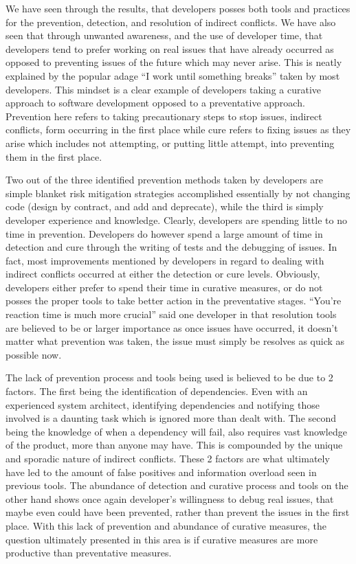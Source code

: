 We have seen through the results, that developers posses both tools and practices for the prevention,
detection, and resolution of indirect conflicts. We have also seen that through unwanted awareness, and the use of developer time,
that developers tend to prefer working on real issues that have already occurred as opposed to preventing issues of the future which
may never arise. This is neatly explained by the popular adage ``I work until something breaks'' taken by most developers. This mindset
is a clear example of developers taking a curative approach to software development opposed to a preventative approach.
Prevention here refers to taking precautionary steps to stop issues, indirect conflicts, form occurring in the first
place while cure refers to fixing issues as they arise which includes not attempting, or putting little attempt, into preventing
them in the first place.

Two out of the three identified prevention methods taken by developers are simple blanket risk mitigation strategies
accomplished essentially by
not changing code (design by contract, and add and deprecate), while the third is simply developer experience and knowledge. Clearly,
developers are spending little to no time in prevention. Developers do however spend a large amount of time in detection and cure through the
writing of tests and the debugging of issues. In fact, most improvements mentioned by developers in regard to dealing with indirect
conflicts occurred at either the detection or cure levels. Obviously, developers either prefer to spend their time in curative
measures, or do not posses the proper tools to take better action in the preventative stages. ``You're reaction time is much more crucial''
said one developer in that resolution tools are believed to be or larger importance as once issues have occurred, it doesn't
matter what prevention was taken, the issue must simply be resolves as quick as possible now.

The lack of prevention process and tools being used is believed to be due to 2 factors. The first being the identification of dependencies.
Even with an experienced system architect, identifying dependencies and notifying those involved is a daunting task 
which is ignored more than dealt with. The second being the knowledge of when a dependency will fail, also requires vast knowledge
of the product, more than anyone may have. This is compounded by the unique and sporadic nature of indirect conflicts. These 2 factors
are what ultimately have led to the amount of false positives and information overload seen in previous tools. The
abundance of detection and curative process and tools on the other hand shows once again developer's willingness to debug
real issues, that maybe even could have been prevented, rather than prevent the issues in the first place. With
this lack of prevention and abundance of curative measures, the question ultimately presented in this area is if 
curative measures are more productive than preventative measures.

